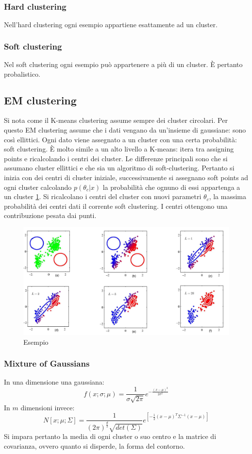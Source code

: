 \subsubsection{Hard clustering}
Nell'hard clustering ogni esempio appartiene esattamente ad un cluster.

\subsubsection{Soft clustering}
Nel soft clustering ogni esempio pu\`o appartenere a pi\`u di un cluster.
\`E pertanto probalistico.

\subsection{EM clustering}
Si nota come il K-means clustering assume sempre dei cluster circolari.
Per questo EM clustering assume che i dati vengano da un'insieme di gaussiane: sono cos\`i ellittici.
Ogni dato viene assegnato a un cluster con una certa probabilit\`a: soft clustering.
\`E molto simile a un alto livello a K-means: itera tra assigning points e ricalcolando i centri dei cluster.
Le differenze principali sono che si assumano cluster ellittici e che sia un algoritmo di soft-clustering.
Pertanto si inizia con dei centri di cluster iniziale, successivamente si assegnano soft points ad ogni cluster calcolando $p(\theta_c|x)$ la probabilit\`a che ognuno di essi appartenga a un cluster \ref{fig:chapter12-12}.
Si ricalcolano i centri del cluster con nuovi parametri $\theta_c$, la massima probabilit\`a dei centri dati il corrente soft clustering.
I centri ottengono una contribuzione pesata dai punti.
\begin{figure}
	\centering
	\includegraphics[width=0.8\linewidth]{imgs/chapter12/img12}
	\caption{Esempio}
	\label{fig:chapter12-12}
\end{figure}

\subsubsection{Mixture of Gaussians}
In una dimensione una gaussiana:
$$f(x;\sigma;\mu) = \frac{1}{\sigma\sqrt{2\pi}}e^{-\frac{(x-\mu)^2}{2\sigma^2}}$$
In $m$ dimensioni invece:
$$N[x;\mu;\Sigma] = \frac{1}{(2\pi)^{\frac{d}{2}}\sqrt{det(\Sigma)}}e^{[-\frac{1}{2}(x-\mu)^T\Sigma^{-1}(x-\mu)]}$$
Si impara pertanto la media di ogni cluster o suo centro e la matrice di covarianza, ovvero quanto si disperde, la forma del contorno.

